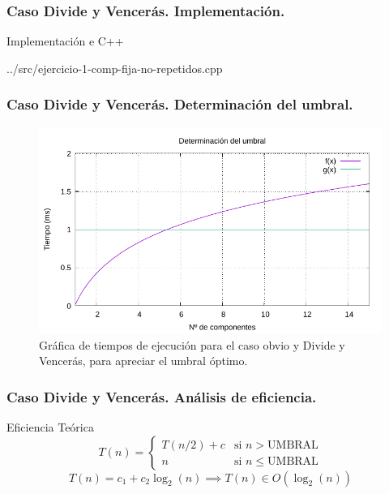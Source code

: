 \documentclass[13pt]{beamer}
\begin{document}
	\begin{frame}
		\frametitle{Caso Divide y Vencerás. Implementación.}
		\begin{exampleblock}{Implementación e C++}
			
			{../src/ejercicio-1-comp-fija-no-repetidos.cpp} 
		\end{exampleblock}
	\end{frame}

	\begin{frame}
		\frametitle{Caso Divide y Vencerás. Determinación del umbral.}
		\begin{figure}
			\centering
			\includegraphics[scale=0.76]{img/e1a-umbral.pdf}
			\caption{Gráfica de tiempos de ejecución para el caso obvio y Divide y Vencerás, para apreciar el umbral
				óptimo.}
			\label{fig:1a-com-graph}
		\end{figure}
	\end{frame}

	\begin{frame}
	\frametitle{Caso Divide y Vencerás. Análisis de eficiencia.}
		\begin{block}{Eficiencia Teórica}
			\begin{equation}
			T(n) = \left\{ \begin{array}{lr} T(n/2) + c & \text{si } n > \text{UMBRAL}\\ n & \text{si } n \leqslant \text{UMBRAL} \end{array} \right.
			\label{eq:1a-efi-dyv-rec}
			\end{equation}
			\begin{equation}
			T(n) = c_{1} + c_{2} \log_2(n) \implies \boxed{T(n) \in O(\log_2(n))}
			\label{eq:1a-eficiencia-lineal}
			\end{equation}
		\end{block}
	\end{frame}
\end{document}

